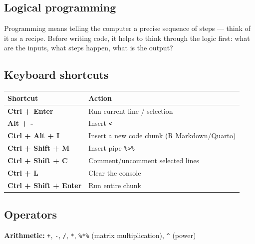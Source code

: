 \documentclass[
  letterpaper,
  DIV=11,
  numbers=noendperiod]{scrartcl}
\newcounter{none} %
\begin{document}
\subsection{Logical programming}\label{logical-programming}

Programming means telling the computer a precise sequence of steps ---
think of it as a recipe. Before writing code, it helps to think through
the logic first: what are the inputs, what steps happen, what is the
output?

\subsection{Keyboard shortcuts}\label{keyboard-shortcuts}

{\def\LTcaptype{none} %
\begin{longtable}[]{@{}
  >{\raggedright\arraybackslash}p{}
  >{\raggedright\arraybackslash}p{}@{}}
\toprule\noalign{}
\begin{minipage}[b]{\linewidth}\raggedright
Shortcut
\end{minipage} & \begin{minipage}[b]{\linewidth}\raggedright
Action
\end{minipage} \\
\midrule\noalign{}
\endhead
\bottomrule\noalign{}
\endlastfoot
\textbf{Ctrl + Enter} & Run current line / selection \\
\textbf{Alt + -} & Insert \texttt{\textless{}-} \\
\textbf{Ctrl + Alt + I} & Insert a new code chunk (R Markdown/Quarto) \\
\textbf{Ctrl + Shift + M} & Insert pipe \texttt{\%\textgreater{}\%} \\
\textbf{Ctrl + Shift + C} & Comment/uncomment selected lines \\
\textbf{Ctrl + L} & Clear the console \\
\textbf{Ctrl + Shift + Enter} & Run entire chunk \\
\end{longtable}
}

\subsection{Operators}\label{operators}

\textbf{Arithmetic:} \texttt{+}, \texttt{-}, \texttt{/}, \texttt{*},
\texttt{\%*\%} (matrix multiplication), \texttt{\^{}} (power)
\end{document}
